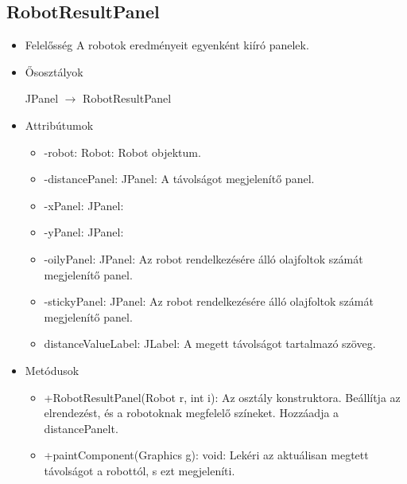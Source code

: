 \subsection{RobotResultPanel}
\begin{itemize}
	\item Felelősség\newline
	A robotok eredményeit egyenként kiíró panelek.
	\item Ősosztályok\newline

		JPanel $\rightarrow$ RobotResultPanel
		
		\item Attribútumok\newline
		\begin{itemize}
			\item -robot: Robot: Robot objektum.
			\item -distancePanel: JPanel: A távolságot megjelenítő panel.
			\item -xPanel: JPanel: 
			\item -yPanel: JPanel: 
			\item -oilyPanel: JPanel: Az robot rendelkezésére álló olajfoltok számát megjelenítő panel.
			\item -stickyPanel: JPanel: Az robot rendelkezésére álló olajfoltok számát megjelenítő panel.
			\item distanceValueLabel: JLabel: A megett távolságot tartalmazó szöveg.
		\end{itemize}
		\item Metódusok\newline
		\begin{itemize}
			\item +RobotResultPanel(Robot r, int i): Az osztály konstruktora. Beállítja az elrendezést, és a robotoknak megfelelő színeket. Hozzáadja a distancePanelt.
			\item +paintComponent(Graphics g): void: Lekéri az aktuálisan megtett távolságot a robottól, s ezt megjeleníti.
		\end{itemize}
	\end{itemize}
	
